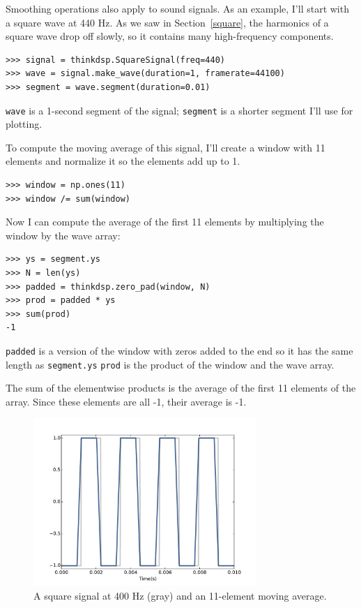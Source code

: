 \documentclass[12pt]{book}
\begin{document}
Smoothing operations also apply to sound signals.  As an example, I'll
start with a square wave at 440 Hz.  As we saw in
Section~\ref{square}, the harmonics of a square wave drop off
slowly, so it contains many high-frequency components.

\begin{verbatim}
>>> signal = thinkdsp.SquareSignal(freq=440)
>>> wave = signal.make_wave(duration=1, framerate=44100)
>>> segment = wave.segment(duration=0.01)
\end{verbatim}

{\tt wave} is a 1-second segment of the signal; {\tt segment}
is a shorter segment I'll use for plotting.

To compute the moving average of this signal, I'll create
a window with 11 elements and normalize it so the elements
add up to 1.

\begin{verbatim}
>>> window = np.ones(11)
>>> window /= sum(window)
\end{verbatim}

Now I can compute the average of the first 11 elements by
multiplying the window by the wave array:

\begin{verbatim}
>>> ys = segment.ys
>>> N = len(ys)
>>> padded = thinkdsp.zero_pad(window, N)
>>> prod = padded * ys
>>> sum(prod)
-1
\end{verbatim}

{\tt padded} is a version of the window with zeros added to
the end so it has the same length as {\tt segment.ys}
{\tt prod} is the product of the window and the wave array.

The sum of the elementwise products is the average of the first 11
elements of the array.  Since these elements are all -1, their average
is -1.

\begin{figure}
\centerline{\includegraphics[height=2.5in]{figs/convolution2.pdf}}
\caption{A square signal at 400 Hz (gray) and an 11-element
moving average.}
\label{fig.convolution2}
\end{figure}
\end{document}
